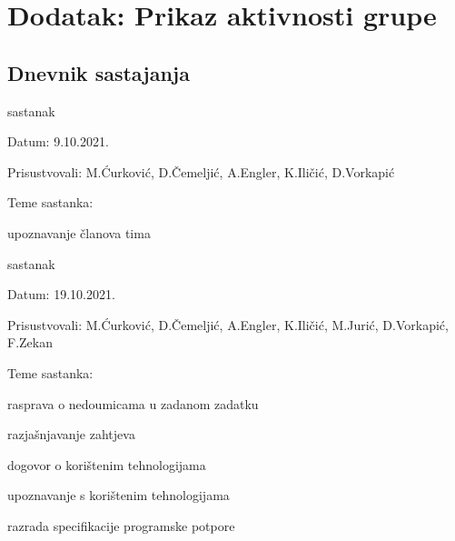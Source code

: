 \chapter*{Dodatak: Prikaz aktivnosti grupe}

\section*{Dnevnik sastajanja}

\begin{packed_enum}
	\item  sastanak
	
	\item[] \begin{packed_item}
		\item Datum: 9.10.2021.
		\item Prisustvovali: M.Ćurković, D.Čemeljić, A.Engler, K.Iličić, D.Vorkapić
		\item Teme sastanka:
		\begin{packed_item}
			\item  upoznavanje članova tima
		\end{packed_item}
	\end{packed_item}
	
	
	
	\item  sastanak
	\item[] \begin{packed_item}
		\item Datum: 19.10.2021.
		\item Prisustvovali: M.Ćurković, D.Čemeljić, A.Engler, K.Iličić, M.Jurić, D.Vorkapić, F.Zekan
		\item Teme sastanka:
		\begin{packed_item}
			\item  rasprava o nedoumicama u zadanom zadatku
			\item  razjašnjavanje zahtjeva
			\item  dogovor o korištenim tehnologijama
			\item  upoznavanje s korištenim tehnologijama
			\item  razrada specifikacije programske potpore
		\end{packed_item}
	\end{packed_item}
	
	
	

\end{packed_enum}
